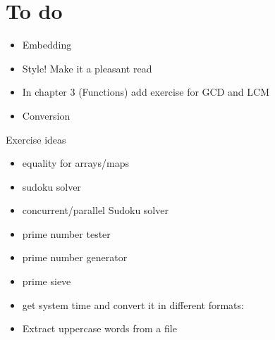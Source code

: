 \section{To do}


\begin{itemize}
Run gotest -test.bench=Bench -test.cpuprofile=cpuprof

    \$(GC) y.go
    \$(LD) -o units y.\$O

This will generate a cpu profile. You can examine it with gopprof:

gopprof 8.out cpuprof

http://blog.golang.org/2011/06/profiling-go-programs.html

- Evan

\item
Embedding
\item
Style! Make it a pleasant read
\item
In chapter 3 (Functions) add exercise for GCD and LCM
\item
Conversion 
\end{itemize}
Exercise ideas
\begin{itemize}
\item
equality for arrays/maps
\item
sudoku solver
\item
concurrent/parallel Sudoku solver
\item
prime number tester
\item
prime number generator
\item
prime sieve
\item
get system time and convert it in different formats:
\item
Extract uppercase words from a file
\end{itemize}
